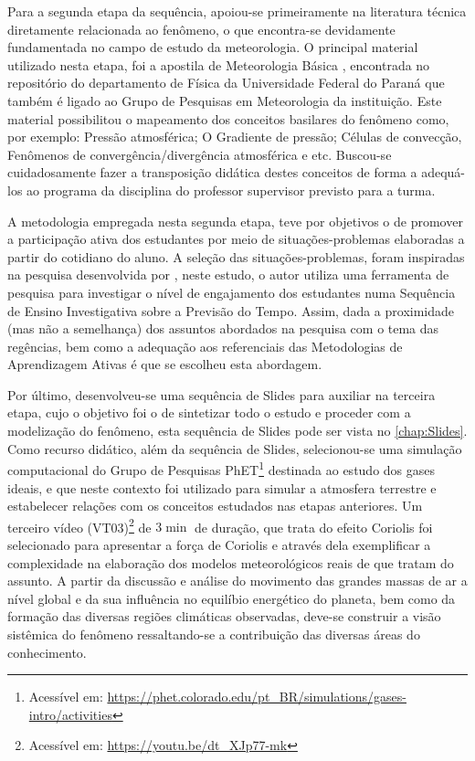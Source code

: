 Para a segunda etapa da sequência, apoiou-se primeiramente na literatura técnica diretamente relacionada ao fenômeno, o que encontra-se devidamente fundamentada no campo de estudo da meteorologia. O principal material utilizado nesta etapa, foi a apostila de Meteorologia Básica \cite{GRIMM:1999}, encontrada no repositório do departamento de Física da Universidade Federal do Paraná que também é ligado ao Grupo de Pesquisas em Meteorologia da instituição. Este material possibilitou o mapeamento dos conceitos basilares do fenômeno como, por exemplo: Pressão atmosférica; O Gradiente de pressão; Células de convecção, Fenômenos de convergência/divergência atmosférica e etc. Buscou-se cuidadosamente fazer a transposição didática destes conceitos de forma a adequá-los ao programa da disciplina do professor supervisor previsto para a turma.

A metodologia empregada nesta segunda etapa, teve por objetivos o de promover a participação ativa dos estudantes por meio de situações-problemas elaboradas a partir do cotidiano do aluno. A seleção das situações-problemas, foram inspiradas na pesquisa desenvolvida por , neste estudo, o autor utiliza uma ferramenta de pesquisa para investigar o nível de engajamento dos estudantes numa Sequência de Ensino Investigativa sobre a Previsão do Tempo. Assim, dada a proximidade (mas não a semelhança) dos assuntos abordados na pesquisa com o tema das regências, bem como a adequação aos referenciais das Metodologias de Aprendizagem Ativas é que se escolheu esta abordagem.

Por último, desenvolveu-se uma sequência de Slides para auxiliar na terceira etapa, cujo o objetivo foi o de sintetizar todo o estudo e proceder com a modelização do fenômeno, esta sequência de Slides pode ser vista no \autoref{chap:Slides}. Como recurso didático, além da sequência de Slides, selecionou-se uma simulação computacional do Grupo de Pesquisas \ac{PhET}\footnote{Acessível em: \url{https://phet.colorado.edu/pt_BR/simulations/gases-intro/activities}} destinada ao estudo dos gases ideais, e que neste contexto foi utilizado para simular a atmosfera terrestre e estabelecer relações com os conceitos estudados nas etapas anteriores. Um terceiro vídeo (VT03)\footnote{Acessível em: \url{https://youtu.be/dt_XJp77-mk}} de $3\min$ de duração, que trata do efeito Coriolis foi selecionado para apresentar a força de Coriolis e através dela exemplificar a complexidade na elaboração dos modelos meteorológicos reais de que tratam do assunto. A partir da discussão e análise do movimento das grandes massas de ar a nível global e da sua influência no equilíbio energético do planeta, bem como da formação das diversas regiões climáticas observadas, deve-se construir a visão sistêmica do fenômeno ressaltando-se a contribuição das diversas áreas do conhecimento.

